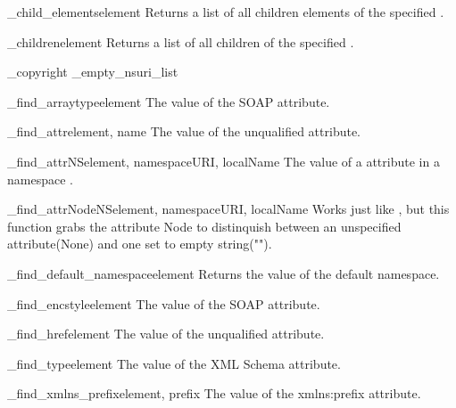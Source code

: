 \begin{funcdesc}{_child_elements}{element}
Returns a list of all children elements of the specified .
\end{funcdesc}

\begin{funcdesc}{_children}{element}
Returns a list of all children of the specified .
\end{funcdesc}

_copyright
_empty_nsuri_list
\begin{funcdesc}{_find_arraytype}{element}
The value of the SOAP  attribute.
\end{funcdesc}

\begin{funcdesc}{_find_attr}{element, name}
The value of the unqualified  attribute.
\end{funcdesc}

\begin{funcdesc}{_find_attrNS}{element, namespaceURI, localName}
The value of a  attribute in a namespace .
\end{funcdesc}

\begin{funcdesc}{_find_attrNodeNS}{element, namespaceURI, localName}
Works just like , but this function grabs the attribute Node to
distinquish between an unspecified attribute(None) and one set to empty
string("").
\end{funcdesc}

\begin{funcdesc}{_find_default_namespace}{element}
Returns the value of the default namespace. 
\end{funcdesc}

\begin{funcdesc}{_find_encstyle}{element}
The value of the SOAP  attribute.
\end{funcdesc}

\begin{funcdesc}{_find_href}{element}
The value of the unqualified  attribute.
\end{funcdesc}

\begin{funcdesc}{_find_type}{element}
The value of the XML Schema  attribute.
\end{funcdesc}

\begin{funcdesc}{_find_xmlns_prefix}{element, prefix}
The value of the xmlns:prefix  attribute.
\end{funcdesc}

